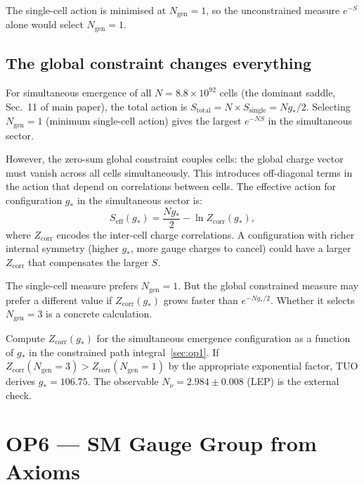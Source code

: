 \documentclass[12pt,a4paper]{article}
\theoremstyle{remark}
\newcommand{\gstar}{g_{*}}
\begin{document}
The single-cell action is minimised at $N_\mathrm{gen} = 1$, so the
unconstrained measure $e^{-S}$ alone would select $N_\mathrm{gen} = 1$.

\subsection{The global constraint changes everything}

For simultaneous emergence of all $N = 8.8\times10^{92}$ cells
(the dominant saddle, Sec.~11 of main paper), the total action is
$S_\mathrm{total} = N\times S_\mathrm{single} = N\gstar/2$.
Selecting $N_\mathrm{gen} = 1$ (minimum single-cell action) gives
the largest $e^{-NS}$ in the simultaneous sector.

However, the zero-sum global constraint couples cells:
the global charge vector must vanish across all cells simultaneously.
This introduces off-diagonal terms in the action that depend on
correlations between cells.
The effective action for configuration $\gstar$ in the simultaneous
sector is:
\[
  S_\mathrm{eff}(\gstar) = \frac{N\gstar}{2}
  - \ln Z_\mathrm{corr}(\gstar),
\]
where $Z_\mathrm{corr}$ encodes the inter-cell charge correlations.
A configuration with richer internal symmetry (higher $\gstar$,
more gauge charges to cancel) could have a larger $Z_\mathrm{corr}$
that compensates the larger $S$.

\begin{tcolorbox}[findingbox,title={Finding}]
The single-cell measure prefers $N_\mathrm{gen} = 1$.
But the global constrained measure may prefer a different value
if $Z_\mathrm{corr}(\gstar)$ grows faster than $e^{-N\gstar/2}$.
Whether it selects $N_\mathrm{gen} = 3$ is a concrete calculation.
\end{tcolorbox}

\begin{tcolorbox}[openbox,title={What closes OP5}]
Compute $Z_\mathrm{corr}(\gstar)$ for the simultaneous emergence
configuration as a function of $\gstar$ in the constrained path
integral~\eqref{sec:op1}.
If $Z_\mathrm{corr}(N_\mathrm{gen} = 3) > Z_\mathrm{corr}(N_\mathrm{gen} = 1)$
by the appropriate exponential factor, TUO derives $\gstar = 106.75$.
The observable $N_\nu = 2.984\pm0.008$ (LEP) is the external check.
\end{tcolorbox}

\section{OP6 --- SM Gauge Group from Axioms}
\label{sec:op6}
\end{document}
